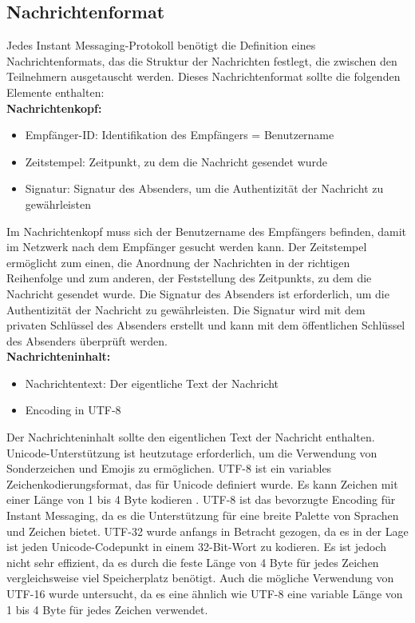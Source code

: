 \subsection{Nachrichtenformat}

Jedes Instant Messaging-Protokoll benötigt die Definition eines Nachrichtenformats,
das die Struktur der Nachrichten festlegt, die zwischen den Teilnehmern ausgetauscht werden.
Dieses Nachrichtenformat sollte die folgenden Elemente enthalten:
\\

\noindent \textbf{Nachrichtenkopf:}
\begin{itemize}
    \item Empfänger-ID: Identifikation des Empfängers = Benutzername
    \item Zeitstempel: Zeitpunkt, zu dem die Nachricht gesendet wurde
    \item Signatur: Signatur des Absenders, um die Authentizität der Nachricht zu gewährleisten
\end{itemize}

\noindent Im Nachrichtenkopf muss sich der Benutzername des Empfängers befinden, damit im Netzwerk nach dem Empfänger gesucht werden kann. Der Zeitstempel ermöglicht zum einen, die Anordnung der Nachrichten in der richtigen Reihenfolge und zum anderen, der Feststellung des Zeitpunkts, zu dem die Nachricht gesendet wurde. Die Signatur des Absenders ist erforderlich, um die Authentizität der Nachricht zu gewährleisten. Die Signatur wird mit dem privaten Schlüssel des Absenders erstellt und kann mit dem öffentlichen Schlüssel des Absenders überprüft werden.
\\


\noindent \textbf{Nachrichteninhalt:}
\begin{itemize}
    \item Nachrichtentext: Der eigentliche Text der Nachricht
    \item Encoding in UTF-8
\end{itemize}

\noindent Der Nachrichteninhalt sollte den eigentlichen Text der Nachricht enthalten. Unicode-Unterstützung ist heutzutage erforderlich, um die Verwendung von Sonderzeichen und Emojis zu ermöglichen. UTF-8 ist ein variables Zeichenkodierungsformat, das für Unicode definiert wurde. Es kann Zeichen mit einer Länge von 1 bis 4 Byte kodieren \parencite[S. 4]{rfc3629_utf-8}. UTF-8 ist das bevorzugte Encoding für Instant Messaging, da es die Unterstützung für eine breite Palette von Sprachen und Zeichen bietet. UTF-32 wurde anfangs in Betracht gezogen, da es in der Lage ist jeden Unicode-Codepunkt in einem 32-Bit-Wort zu kodieren. Es ist jedoch nicht sehr effizient, da es durch die feste Länge von 4 Byte für jedes Zeichen vergleichsweise viel Speicherplatz benötigt. Auch die mögliche Verwendung von UTF-16 wurde untersucht, da es eine ähnlich wie UTF-8 eine variable Länge von 1 bis 4 Byte für jedes Zeichen verwendet.  
\\


